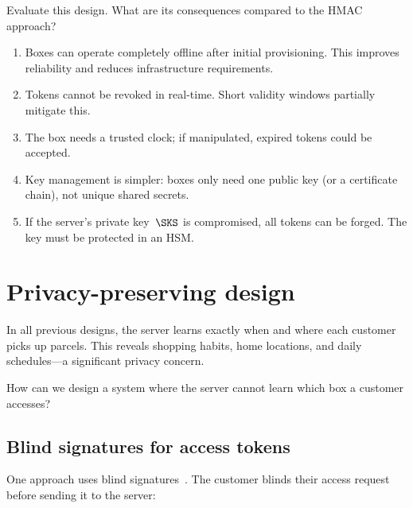 \begin{exercise}
  Evaluate this design.
  What are its consequences compared to the HMAC approach?
\end{exercise}

\begin{enumerate}
  \item Boxes can operate completely offline after initial provisioning.
    This improves reliability and reduces infrastructure requirements.
  \item Tokens cannot be revoked in real-time.
    Short validity windows partially mitigate this.
  \item The box needs a trusted clock; if manipulated, expired tokens
    could be accepted.
  \item Key management is simpler: boxes only need one public key
    (or a certificate chain), not unique shared secrets.
  \item If the server's private key~\(\SKS\) is compromised, all tokens
    can be forged.
    The key must be protected in an HSM.
\end{enumerate}


\section{Privacy-preserving design}\label{PrivacyDesign}


In all previous designs, the server learns exactly when and where each
customer picks up parcels.
This reveals shopping habits, home locations, and daily schedules---a
significant privacy concern.

\begin{exercise}
  How can we design a system where the server cannot learn which box a
  customer accesses?
\end{exercise}

\subsection{Blind signatures for access tokens}

One approach uses blind signatures~\autocite{ecash}.
The customer blinds their access request before sending it to the server:

